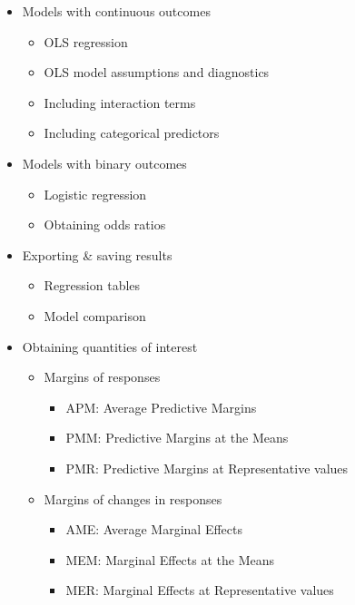 \documentclass[
]{book}
\providecommand{\tightlist}{%
  \setlength{\itemsep}{0pt}\setlength{\parskip}{0pt}}
\begin{document}
\begin{itemize}
\tightlist
\item
  Models with continuous outcomes

  \begin{itemize}
  \tightlist
  \item
    OLS regression
  \item
    OLS model assumptions and diagnostics
  \item
    Including interaction terms
  \item
    Including categorical predictors
  \end{itemize}
\item
  Models with binary outcomes

  \begin{itemize}
  \tightlist
  \item
    Logistic regression
  \item
    Obtaining odds ratios
  \end{itemize}
\item
  Exporting \& saving results

  \begin{itemize}
  \tightlist
  \item
    Regression tables
  \item
    Model comparison
  \end{itemize}
\item
  Obtaining quantities of interest

  \begin{itemize}
  \tightlist
  \item
    Margins of responses

    \begin{itemize}
    \tightlist
    \item
      APM: Average Predictive Margins
    \item
      PMM: Predictive Margins at the Means
    \item
      PMR: Predictive Margins at Representative values
    \end{itemize}
  \item
    Margins of changes in responses

    \begin{itemize}
    \tightlist
    \item
      AME: Average Marginal Effects
    \item
      MEM: Marginal Effects at the Means
    \item
      MER: Marginal Effects at Representative values
    \end{itemize}
  \end{itemize}
\end{itemize}
\end{document}
